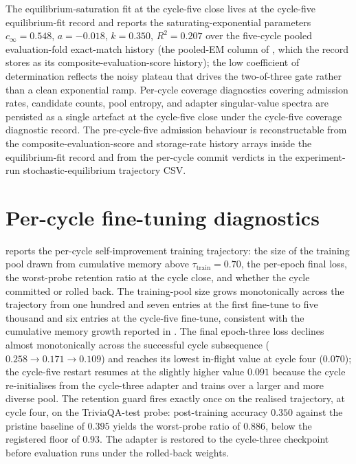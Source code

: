 The equilibrium-saturation fit at the cycle-five close lives at the cycle-five equilibrium-fit record and reports the saturating-exponential parameters $c_{\infty} = 0.548$, $a = -0.018$, $k = 0.350$, $R^{2} = 0.207$ over the five-cycle pooled evaluation-fold exact-match history (the pooled-EM column of , which the record stores as its composite-evaluation-score history); the low coefficient of determination reflects the noisy plateau that drives the two-of-three gate rather than a clean exponential ramp. Per-cycle coverage diagnostics covering admission rates, candidate counts, pool entropy, and adapter singular-value spectra are persisted as a single artefact at the cycle-five close under the cycle-five coverage diagnostic record. The pre-cycle-five admission behaviour is reconstructable from the composite-evaluation-score and storage-rate history arrays inside the equilibrium-fit record and from the per-cycle commit verdicts in the experiment-run stochastic-equilibrium trajectory CSV.

\section{Per-cycle fine-tuning diagnostics}
\label{app:per-cycle-ft}

 reports the per-cycle self-improvement training trajectory: the size of the training pool drawn from cumulative memory above $\tau_{\text{train}} = 0.70$, the per-epoch final loss, the worst-probe retention ratio at the cycle close, and whether the cycle committed or rolled back. The training-pool size grows monotonically across the trajectory from one hundred and seven entries at the first fine-tune to five thousand and six entries at the cycle-five fine-tune, consistent with the cumulative memory growth reported in . The final epoch-three loss declines almost monotonically across the successful cycle subsequence ($0.258 \to 0.171 \to 0.109$) and reaches its lowest in-flight value at cycle four ($0.070$); the cycle-five restart resumes at the slightly higher value $0.091$ because the cycle re-initialises from the cycle-three adapter and trains over a larger and more diverse pool. The retention guard fires exactly once on the realised trajectory, at cycle four, on the TriviaQA-test probe: post-training accuracy $0.350$ against the pristine baseline of $0.395$ yields the worst-probe ratio of $0.886$, below the registered floor of $0.93$. The adapter is restored to the cycle-three checkpoint before evaluation runs under the rolled-back weights.


